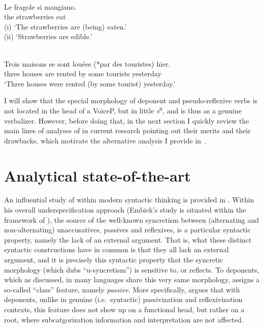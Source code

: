 \documentclass[output=paper]{langsci/langscibook}
\begin{document}
\ea\label{ex:key:10.11} \\
    \gll Le  fragole      si    mangiano.\\
        the strawberries  \Refl{}  eat\\
    \glt (i) ‘The strawberries are (being) eaten.’\\
        (ii) ‘Strawberries are edible.’
\z

\ea\label{ex:key:10.12} \\
    \gll Trois maisons  se    sont  louées (*par des touristes) hier.\\
        three houses \Refl{}  are  rented \hphantom{(*}by some tourists yesterday\\
    \glt ‘Three houses were rented (by some tourist) yesterday.’
\z

I will show that the special morphology of deponent and pseudo-reflexive verbs
is not located in the head of a VoiceP, but in little \emph{v}$^0$, and is thus
as a genuine verbalizer. However, before doing that, in the next section I
quickly review the main lines of analyses of  in current research
pointing out their merits and their drawbacks, which motivate the alternative
analysis I provide in~.

\section{Analytical state-of-the-art}\label{sec:key:10.3}

An influential study of  within modern syntactic thinking is
pro\-vi\-ded in \citet{Embick1997}. Within his overall underspecification
approach (Embick’s study is situated within the framework of ), the source of the well-known syncretism between (alternating and
non-alternating) unaccusatives, passives and reflexives, is a particular
syntactic property, namely the lack of an external argument. That is, what
these distinct syntactic constructions have in common is that they all lack an
external argument, and it is precisely this syntactic property that the
syncretic morphology (which \citeauthor{Embick1997} dubs “u-syn\-cre\-tism”) is
sensitive to, or reflects. To deponents, which as discussed, in many languages
share this very same morphology, \citeauthor{Embick1997} assigns a so-called
“class” feature, namely \emph{passive}. More specifically,
\citeauthor{Embick1997} argues that with deponents, unlike in genuine (i.e.\
syntactic) passivization and reflexivization contexts, this feature does not
show up on a functional head\is{functional items}, but rather on a root, where subcatgorization
information and interpretation are not affected.
\end{document}
